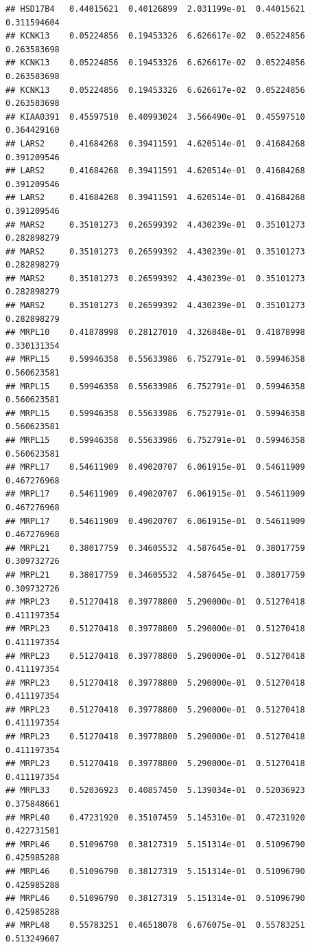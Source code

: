 \documentclass[
]{article}
\begin{document}
\begin{verbatim}
## HSD17B4   0.44015621  0.40126899  2.031199e-01  0.44015621  0.311594604
## KCNK13    0.05224856  0.19453326  6.626617e-02  0.05224856  0.263583698
## KCNK13    0.05224856  0.19453326  6.626617e-02  0.05224856  0.263583698
## KCNK13    0.05224856  0.19453326  6.626617e-02  0.05224856  0.263583698
## KIAA0391  0.45597510  0.40993024  3.566490e-01  0.45597510  0.364429160
## LARS2     0.41684268  0.39411591  4.620514e-01  0.41684268  0.391209546
## LARS2     0.41684268  0.39411591  4.620514e-01  0.41684268  0.391209546
## LARS2     0.41684268  0.39411591  4.620514e-01  0.41684268  0.391209546
## MARS2     0.35101273  0.26599392  4.430239e-01  0.35101273  0.282898279
## MARS2     0.35101273  0.26599392  4.430239e-01  0.35101273  0.282898279
## MARS2     0.35101273  0.26599392  4.430239e-01  0.35101273  0.282898279
## MARS2     0.35101273  0.26599392  4.430239e-01  0.35101273  0.282898279
## MRPL10    0.41878998  0.28127010  4.326848e-01  0.41878998  0.330131354
## MRPL15    0.59946358  0.55633986  6.752791e-01  0.59946358  0.560623581
## MRPL15    0.59946358  0.55633986  6.752791e-01  0.59946358  0.560623581
## MRPL15    0.59946358  0.55633986  6.752791e-01  0.59946358  0.560623581
## MRPL15    0.59946358  0.55633986  6.752791e-01  0.59946358  0.560623581
## MRPL17    0.54611909  0.49020707  6.061915e-01  0.54611909  0.467276968
## MRPL17    0.54611909  0.49020707  6.061915e-01  0.54611909  0.467276968
## MRPL17    0.54611909  0.49020707  6.061915e-01  0.54611909  0.467276968
## MRPL21    0.38017759  0.34605532  4.587645e-01  0.38017759  0.309732726
## MRPL21    0.38017759  0.34605532  4.587645e-01  0.38017759  0.309732726
## MRPL23    0.51270418  0.39778800  5.290000e-01  0.51270418  0.411197354
## MRPL23    0.51270418  0.39778800  5.290000e-01  0.51270418  0.411197354
## MRPL23    0.51270418  0.39778800  5.290000e-01  0.51270418  0.411197354
## MRPL23    0.51270418  0.39778800  5.290000e-01  0.51270418  0.411197354
## MRPL23    0.51270418  0.39778800  5.290000e-01  0.51270418  0.411197354
## MRPL23    0.51270418  0.39778800  5.290000e-01  0.51270418  0.411197354
## MRPL23    0.51270418  0.39778800  5.290000e-01  0.51270418  0.411197354
## MRPL33    0.52036923  0.40857450  5.139034e-01  0.52036923  0.375848661
## MRPL40    0.47231920  0.35107459  5.145310e-01  0.47231920  0.422731501
## MRPL46    0.51096790  0.38127319  5.151314e-01  0.51096790  0.425985288
## MRPL46    0.51096790  0.38127319  5.151314e-01  0.51096790  0.425985288
## MRPL46    0.51096790  0.38127319  5.151314e-01  0.51096790  0.425985288
## MRPL48    0.55783251  0.46518078  6.676075e-01  0.55783251  0.513249607

\end{verbatim}
\end{document}
